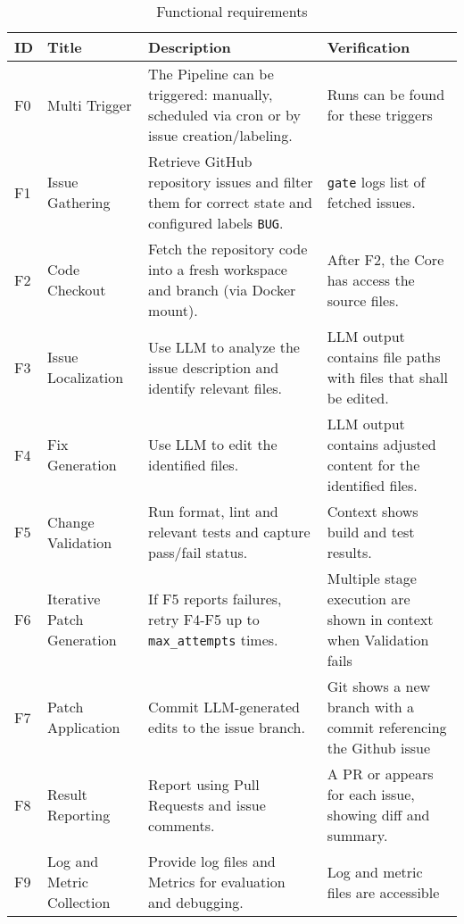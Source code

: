 \begin{longtable}{@{\extracolsep{\fill}} p{0.5cm} | p{3cm} | p{6cm} | p{4cm} @{}}
    \caption{Functional requirements} \label{tab:functional-requirements} \\
    \hline
    \textbf{ID} & \textbf{Title} & \textbf{Description} & \textbf{Verification} \\
    \hline
    \endfirsthead

    \hline
    \endfoot
        F0 \label{f0} & Multi Trigger
        & The Pipeline can be triggered: manually, scheduled via cron or by issue creation/labeling.
        & Runs can be found for these triggers \\ \hline
        F1 \label{f1} & Issue Gathering
        & Retrieve GitHub repository issues and filter them for correct state and configured labels \texttt{BUG}.
        & \texttt{gate} logs list of fetched issues.  \\ \hline
        F2 \label{f2} & Code Checkout
        & Fetch the repository code into a fresh workspace and branch (via Docker mount).
        & After F2, the Core has access the source files. \\ \hline
        F3 \label{f3} & Issue Localization
        & Use LLM to analyze the issue description and identify relevant files.
        & LLM output contains file paths with files that shall be edited. \\ \hline
        F4 \label{f4} & Fix Generation
        & Use LLM to edit the identified files.
        & LLM output contains adjusted content for the identified files. \\ \hline
        F5 \label{f5} & Change Validation
        & Run format, lint and relevant tests and capture pass/fail status.
        & Context shows build and test results. \\ \hline
        F6 \label{f6} & Iterative Patch Generation
        & If F5 reports failures, retry F4-F5 up to \texttt{max\_attempts} times.
        & Multiple stage execution are shown in context when Validation fails \\ \hline
        F7 \label{f7} & Patch Application
        & Commit LLM-generated edits to the issue branch.
        & Git shows a new branch with a commit referencing the Github issue \\ \hline
        F8 \label{f8} & Result Reporting
        & Report using Pull Requests and issue comments.
        & A PR or appears for each issue, showing diff and summary. \\ \hline
        F9 \label{f9} & Log and Metric Collection
        & Provide log files and Metrics for evaluation and debugging.
        & Log and metric files are accessible \\
\end{longtable}

